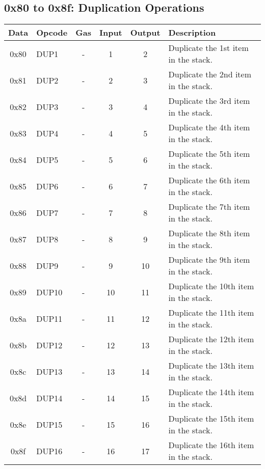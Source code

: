 \documentclass[10pt,a4paper,leqno,bibliography=totoc]{scrartcl}
\newenvironment{alphafootnotes}
{\par\edef\savedfootnotenumber{\number\value{footnote}}
\renewcommand{\thefootnote}{\alph{footnote}}
\setcounter{footnote}{0}}
{\par\setcounter{footnote}{\savedfootnotenumber}}
\begin{document}
\begin{alphafootnotes}
		\subsection{0x80 to 0x8f: Duplication Operations}
			\begin{longtable}{|cP{2.8cm}cccp{6cm}|}
		        \hline
		        \textbf{Data} & \textbf{Opcode} & \textbf{Gas}  & \textbf{Input}  & \textbf{Output} & \textbf{Description} \\
		        \hline
			0x80 & DUP1 & - & 1 & 2 & Duplicate the 1st item in the stack. \\
			0x81 & DUP2 & - & 2 & 3 & Duplicate the 2nd item in the stack. \\
			0x82 & DUP3 & - & 3 & 4 & Duplicate the 3rd item in the stack. \\
			0x83 & DUP4 & - & 4 & 5 & Duplicate the 4th item in the stack. \\
			0x84 & DUP5 & - & 5 & 6 & Duplicate the 5th item in the stack. \\
			0x85 & DUP6 & - & 6 & 7 & Duplicate the 6th item in the stack. \\
			0x86 & DUP7 & - & 7 & 8 & Duplicate the 7th item in the stack. \\
			0x87 & DUP8 & - & 8 & 9 & Duplicate the 8th item in the stack. \\
			0x88 & DUP9 & - & 9 & 10 & Duplicate the 9th item in the stack. \\
			0x89 & DUP10 & - & 10 & 11 & Duplicate the 10th item in the stack. \\
			0x8a & DUP11 & - & 11 & 12 & Duplicate the 11th item in the stack. \\
			0x8b & DUP12 & - & 12 & 13 & Duplicate the 12th item in the stack. \\
			0x8c & DUP13 & - & 13 & 14 & Duplicate the 13th item in the stack. \\
			0x8d & DUP14 & - & 14 & 15 & Duplicate the 14th item in the stack. \\
			0x8e & DUP15 & - & 15 & 16 & Duplicate the 15th item in the stack. \\
			0x8f & DUP16 & - & 16 & 17 & Duplicate the 16th item in the stack. \\		
			\hline
			\end{longtable}
        
	

\end{alphafootnotes}
\end{document}
